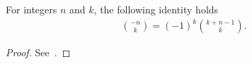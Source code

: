 \begin{lemma}
  \label{lem:upper-binomial-negation}
  For integers $n$ and $k$, the following identity holds
  \begin{align*}
    \binom{-n}{k} = (-1)^{k} \binom{k+n-1}{k}.
  \end{align*}
  \begin{proof}
    See~\cite[p. 164, Equation (5.14)]{graham1994concrete}.
  \end{proof}
\end{lemma}
